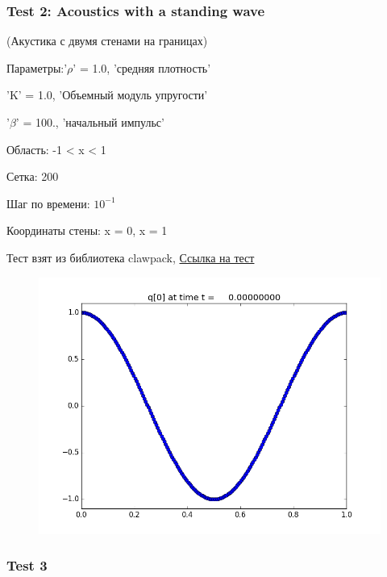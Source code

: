 \documentclass{article}
\begin{document}
 \newpage
 
\subsubsection{Test 2: Acoustics with a standing wave}

(Акустика с двумя стенами на границах)

Параметры:'$\rho$' = 1.0,  'средняя плотность'

             'K' = 1.0,  'Объемный модуль упругости'
             
             '$\beta$' = 100.,  'начальный импульс'
             
Область: -1 < x < 1
 
Сетка: 200
 
Шаг по времени: $10^{-1}$
 
Координаты стены: x = 0, x = 1
 
  Тест взят из библиотека clawpack, \cite{clawpack}
  \href{http://www.clawpack.org/gallery/_static/apps/fvmbook/chap7/standing/README.html}{Ссылка на тест}
 
 \begin{figure}[h]
  \begin{center}
    \includegraphics[scale=0.5]{1D_acoustic_test/TEST2/frame0000fig0.png}
  \end{center}
\end{figure}

\newpage
 
 \subsubsection{Test 3}
 
\end{document}
